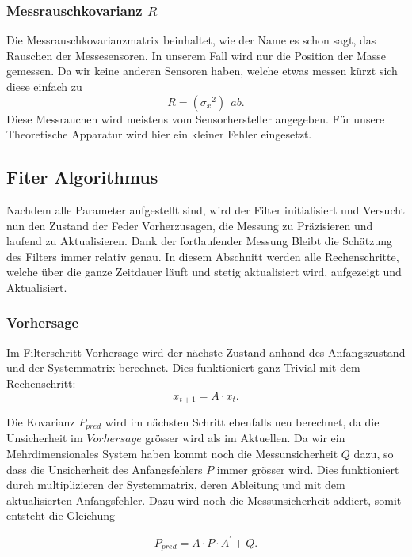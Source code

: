 \documentclass[11pt,a4paper]{article}
\begin{document}
\subsubsection*{Messrauschkovarianz $R$}
Die Messrauschkovarianzmatrix beinhaltet, wie der Name es schon sagt, das Rauschen der Messesensoren. In unserem Fall wird nur die Position der Masse gemessen. Da wir keine anderen Sensoren haben, welche etwas messen kürzt sich diese einfach zu
\begin{equation}
R= ({\sigma_x}^2)\: \: ab.
\end{equation} 
Diese Messrauchen wird meistens vom Sensorhersteller angegeben. Für unsere Theoretische Apparatur wird hier ein kleiner Fehler eingesetzt.

\subsection{Fiter Algorithmus}
Nachdem alle Parameter aufgestellt sind, wird der Filter initialisiert und Versucht nun den Zustand der Feder Vorherzusagen, die Messung zu Präzisieren und laufend zu Aktualisieren. Dank der fortlaufender Messung Bleibt die Schätzung des Filters immer relativ genau. In diesem Abschnitt werden alle Rechenschritte, welche über die ganze Zeitdauer läuft und stetig aktualisiert wird, aufgezeigt und Aktualisiert.


\subsubsection*{Vorhersage}
Im Filterschritt Vorhersage wird der nächste Zustand anhand des Anfangszustand und der Systemmatrix berechnet. Dies funktioniert ganz Trivial mit dem Rechenschritt:
\begin{equation}
{x_{t+1}}=A\cdot{x_t}.
\end{equation} 


Die Kovarianz $P_{pred}$ wird im nächsten Schritt ebenfalls neu berechnet, da die Unsicherheit im $Vorhersage$ grösser wird als im Aktuellen. Da wir ein Mehrdimensionales System haben kommt noch die Messunsicherheit $Q$ dazu, so dass die Unsicherheit des Anfangsfehlers $P$ immer grösser wird. Dies funktioniert durch multiplizieren der Systemmatrix, deren Ableitung und mit dem aktualisierten Anfangsfehler. Dazu wird noch die Messunsicherheit addiert, somit entsteht die Gleichung


\begin{equation}
{P_{pred}}=A\cdot P\cdot A^{\prime}+Q.
\end{equation}
\end{document}
